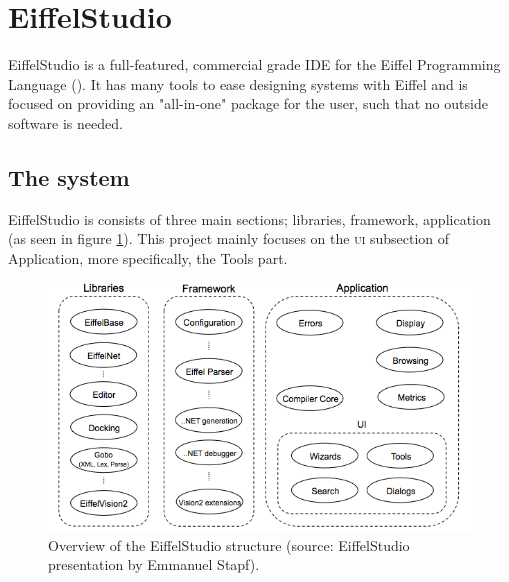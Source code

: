 \section{EiffelStudio}
EiffelStudio is a full-featured, commercial grade IDE for the Eiffel Programming Language (\cite[Quote from Origo website]{eiffel2006}). It has many tools to ease designing systems with Eiffel and is focused on providing an "all-in-one" package for the user, such that no outside software is needed.

\subsection{The system}
EiffelStudio is consists of three main sections; libraries, framework, application (as seen in figure \ref{fig:eiffelstudio_structure}). This project mainly focuses on the \textsc{ui} subsection of Application, more specifically, the Tools part.

\begin{figure}[H]
\centerline{
\includegraphics[scale=0.7]{images/eiffelstudio-structure-full.png}
}
\caption[Overview of the EiffelStudio structure]{Overview of the EiffelStudio structure (source: EiffelStudio presentation by Emmanuel Stapf).}
\label{fig:eiffelstudio_structure}
\end{figure}


